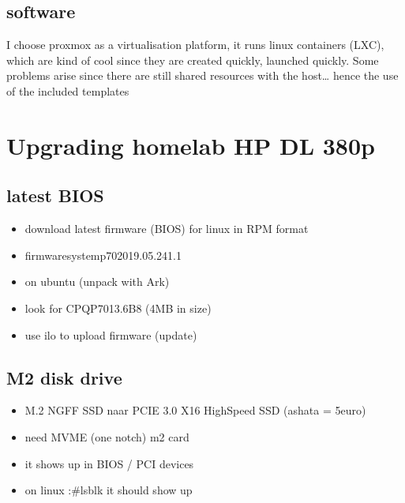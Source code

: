 \documentclass[letterpaper,10pt,english]{sphinxmanual}
\begin{document}
\section{software}
\label{\detokenize{intro:software}}
\sphinxAtStartPar
I choose proxmox as a virtualisation platform, it runs linux containers (LXC), which are kind of cool since they are created quickly, launched quickly. Some problems arise since there are still shared resources with the host… hence the use of the included templates

\sphinxstepscope


\chapter{Upgrading homelab HP DL 380p}
\label{\detokenize{hpdl380p:upgrading-homelab-hp-dl-380p}}\label{\detokenize{hpdl380p::doc}}

\section{latest BIOS}
\label{\detokenize{hpdl380p:latest-bios}}\begin{itemize}
\item {} 
\sphinxAtStartPar
download latest firmware (BIOS) for linux in RPM format

\item {} 
\sphinxAtStartPar
firmware\sphinxhyphen{}system\sphinxhyphen{}p70\sphinxhyphen{}2019.05.24\sphinxhyphen{}1.1

\item {} 
\sphinxAtStartPar
on ubuntu (unpack with Ark)

\item {} 
\sphinxAtStartPar
look for CPQP7013.6B8 (4MB in size)

\item {} 
\sphinxAtStartPar
use ilo to upload firmware (update)

\end{itemize}


\section{M2 disk drive}
\label{\detokenize{hpdl380p:m2-disk-drive}}\begin{itemize}
\item {} 
\sphinxAtStartPar
M.2 NGFF SSD naar PCI\sphinxhyphen{}E 3.0 X16 High\sphinxhyphen{}Speed SSD  (ashata = 5euro)

\item {} 
\sphinxAtStartPar
need MVME (one notch) m2 card

\item {} 
\sphinxAtStartPar
it shows up in BIOS / PCI devices

\item {} 
\sphinxAtStartPar
on linux :\#lsblk it should show up

\end{itemize}
\end{document}

